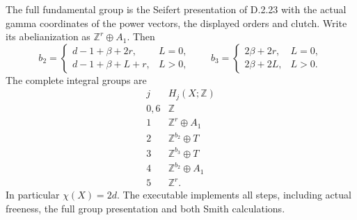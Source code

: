 The full fundamental group is the Seifert presentation
of D.2.23 with the actual gamma coordinates of the
power vectors, the displayed orders and clutch.
Write its abelianization as $\mathbb Z^r\oplus A_1$.
Then
\[
 b_2=
 \begin{cases}
 d-1+\beta+2r,&L=0,\\
 d-1+\beta+L+r,&L>0,
 \end{cases}
 \qquad
 b_3=
 \begin{cases}
 2\beta+2r,&L=0,\\
 2\beta+2L,&L>0.
 \end{cases}                                               \tag{D.WP8}
\]
The complete integral groups are
\[
\begin{array}{c|c}
j&H_j(X;\mathbb Z)\\\hline
0,6&\mathbb Z\\
1&\mathbb Z^r\oplus A_1\\
2&\mathbb Z^{b_2}\oplus T\\
3&\mathbb Z^{b_3}\oplus T\\
4&\mathbb Z^{b_2}\oplus A_1\\
5&\mathbb Z^r .
\end{array}                                                \tag{D.WP9}
\]
In particular $\chi(X)=2d$. The executable
 implements
all steps, including actual freeness, the full group
presentation and both Smith calculations.


